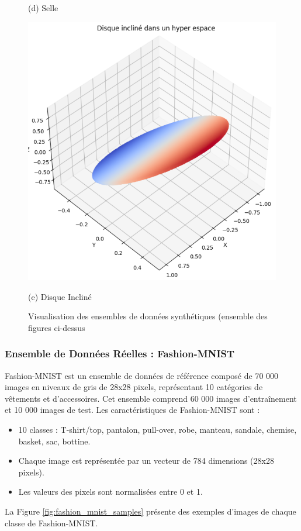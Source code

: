 \documentclass[unnumsec,webpdf,modern,large]{projet_manifold}%
\theoremstyle{thmstyleone}%
\theoremstyle{thmstyletwo}%
\theoremstyle{thmstylethree}%
\begin{document}
\begin{figure}[t]
\begin{minipage}{0.19\textwidth}
        \caption*{(d) Selle}
    \end{minipage}%
    \hfill
    \begin{minipage}{0.19\textwidth}
        \includegraphics[width=\linewidth]{Fig/disque.png}
        \caption*{(e) Disque Incliné}
    \end{minipage}
    \caption{ Visualisation des ensembles de données synthétiques (ensemble des figures ci-dessus}
    \label{fig:synthetic_datasets}
\end{figure}




\subsubsection{Ensemble de Données Réelles : Fashion-MNIST}
Fashion-MNIST \cite{xiao2017fashion} est un ensemble de données de référence composé de 70 000 images en niveaux de gris de 28x28 pixels, représentant 10 catégories de vêtements et d'accessoires. Cet ensemble comprend 60 000 images d'entraînement et 10 000 images de test.
Les caractéristiques de Fashion-MNIST sont :
\begin{itemize}
    \item 10 classes : T-shirt/top, pantalon, pull-over, robe, manteau, sandale, chemise, basket, sac, bottine.
    \item Chaque image est représentée par un vecteur de 784 dimensions (28x28 pixels).
    \item Les valeurs des pixels sont normalisées entre 0 et 1.
\end{itemize}
La Figure \ref{fig:fashion_mnist_samples} présente des exemples d'images de chaque classe de Fashion-MNIST.
\end{document}
